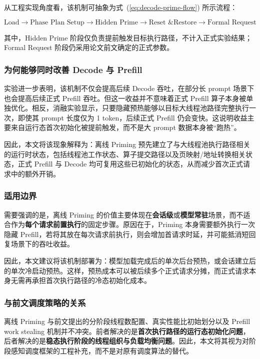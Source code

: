 从工程实现角度看，该机制可抽象为式~(\ref{eq:decode-prime-flow}) 所示流程：

\begin{equation}
\label{eq:decode-prime-flow}
\text{Load} \rightarrow \text{Phase Plan Setup} \rightarrow \text{Hidden Prime}
\rightarrow \text{Reset \& Restore} \rightarrow \text{Formal Request}
\end{equation}

其中，Hidden Prime 阶段仅负责提前触发目标执行路径，不计入正式实验结果；Formal Request 阶段仍采用论文前文确定的正式参数。

\subsubsection{为何能够同时改善 Decode 与 Prefill}

实验进一步表明，该机制不仅会提高后续 Decode 吞吐，在部分长 prompt 场景下也会提高后续正式 Prefill 吞吐。但这一收益并不意味着正式 Prefill 算子本身被单独优化。相反，消融实验显示，只要隐藏预热能够以目标大线程池路径完整执行一次，即使其 prompt 长度仅为 1 token，后续正式 Prefill 仍会变快。这说明收益主要来自运行态首次初始化被提前触发，而不是大 prompt 数据本身被“跑热”。

因此，本文将该现象解释为：离线 Priming 预先建立了与大线程池执行路径相关的运行时状态，包括线程池工作状态、算子提交路径以及页映射/地址转换相关状态，正式 Prefill 与 Decode 均可复用这些已初始化的状态，从而减少首次正式请求中的额外开销。

\subsubsection{适用边界}

需要强调的是，离线 Priming 的价值主要体现在\textbf{会话级}或\textbf{模型常驻}场景，而不适合作为\textbf{每个请求前置执行}的固定步骤。原因在于，Priming 本身需要额外执行一次隐藏 Prefill，若将其放在每次请求前执行，则会增加首请求时延，并可能抵消短回复场景下的吞吐收益。

因此，本文建议将该机制部署为：模型加载完成后的单次后台预热，或会话建立后的单次冷启动预热。这样，预热成本可以被后续多个正式请求分摊，而正式请求本身无需再承担首次执行路径的冷态初始化成本。

\subsubsection{与前文调度策略的关系}

离线 Priming 与前文提出的分阶段线程数配置、真实性能比初始划分以及 Prefill work stealing 机制并不冲突。前者解决的是\textbf{首次执行路径的运行态初始化问题}，后者解决的是\textbf{稳态执行阶段的线程组织与负载均衡问题}。因此，本文将其视为对阶段感知调度框架的工程补充，而不是对原有调度算法的替代。

